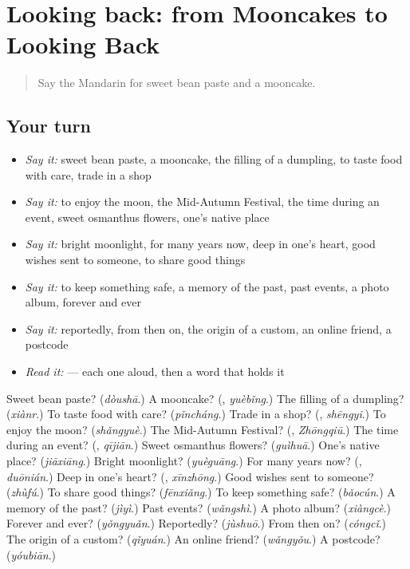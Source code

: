 \section[(dialogue)]{Looking back: from Mooncakes to Looking Back}

\label{lesson:ZH-R345-review-341-345}



\begin{quote}
Say the Mandarin for sweet bean paste and a mooncake.
\end{quote}

\subsection*{Your turn}
\begin{itemize}
\raggedright
  \item \emph{Say it:} sweet bean paste, a mooncake, the filling of a dumpling, to taste food with care, trade in a shop
  \item \emph{Say it:} to enjoy the moon, the Mid-Autumn Festival, the time during an event, sweet osmanthus flowers, one's native place
  \item \emph{Say it:} bright moonlight, for many years now, deep in one's heart, good wishes sent to someone, to share good things
  \item \emph{Say it:} to keep something safe, a memory of the past, past events, a photo album, forever and ever
  \item \emph{Say it:} reportedly, from then on, the origin of a custom, an online friend, a postcode
  \item \emph{Read it:}   — each one aloud, then a word that holds it
\end{itemize}

\begin{tcolorbox}[breakable,colback=teal!4,colframe=teal!35!black,title={Before you move on}]
Sweet bean paste? (\emph{dòushā}.) A mooncake? (\textbf{}, \emph{yuèbǐng}.) The filling of a dumpling? (\emph{xiànr}.) To taste food with care? (\emph{pǐncháng}.) Trade in a shop? (\textbf{}, \emph{shēngyi}.) To enjoy the moon? (\emph{shǎngyuè}.) The Mid-Autumn Festival? (\textbf{}, \emph{Zhōngqiū}.) The time during an event? (\textbf{}, \emph{qījiān}.) Sweet osmanthus flowers? (\emph{guìhuā}.) One's native place? (\emph{jiāxiāng}.) Bright moonlight? (\emph{yuèguāng}.) For many years now? (\textbf{}, \emph{duōnián}.) Deep in one's heart? (\textbf{}, \emph{xīnzhōng}.) Good wishes sent to someone? (\emph{zhùfú}.) To share good things? (\emph{fēnxiǎng}.) To keep something safe? (\emph{bǎocún}.) A memory of the past? (\emph{jìyì}.) Past events? (\emph{wǎngshì}.) A photo album? (\emph{xiàngcè}.) Forever and ever? (\emph{yǒngyuǎn}.) Reportedly? (\emph{jùshuō}.) From then on? (\emph{cóngcǐ}.) The origin of a custom? (\emph{qǐyuán}.) An online friend? (\emph{wǎngyǒu}.) A postcode? (\emph{yóubiān}.)
\end{tcolorbox}
